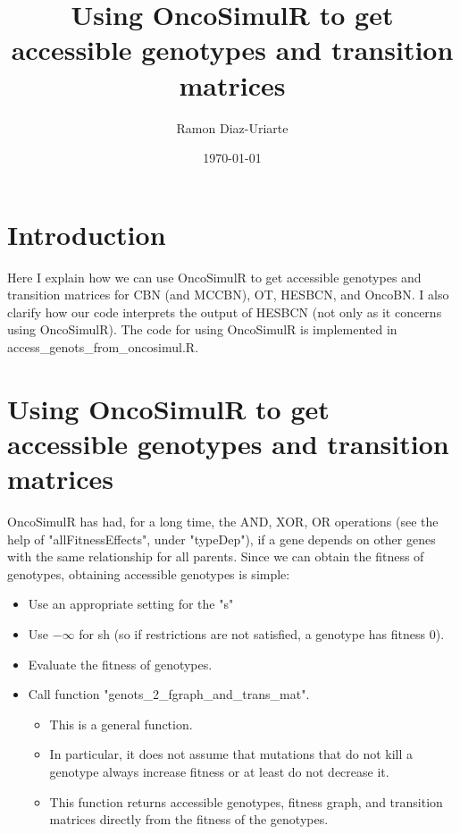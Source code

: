 \documentclass[11pt]{article}
\author{Ramon Diaz-Uriarte}
\date{\today}
\title{Using OncoSimulR to get accessible genotypes and transition matrices}
\begin{document}
\maketitle
\tableofcontents



\section{Introduction}
\label{sec:org58f26ba}
Here I explain how we can use OncoSimulR to get accessible genotypes and transition matrices for CBN (and MCCBN), OT, HESBCN, and OncoBN. I also clarify how our code interprets the output of HESBCN (not only as it concerns using OncoSimulR). The code for using OncoSimulR is implemented in access\_genots\_from\_oncosimul.R. 

\section{Using OncoSimulR to get accessible genotypes and transition matrices}
\label{sec:org653c242}

OncoSimulR has had, for a long time, the AND, XOR, OR operations (see the help of "allFitnessEffects", under "typeDep"), if a gene depends on other genes with the same relationship for all parents. Since we can obtain the fitness of genotypes, obtaining accessible genotypes is simple:


\begin{itemize}
\item Use an appropriate setting for the "s"
\item Use \(-\infty\) for sh (so if restrictions are not satisfied, a genotype has
fitness 0).
\item Evaluate the fitness of genotypes.
\item Call function "genots\_2\_fgraph\_and\_trans\_mat".
\begin{itemize}
\item This is a general function.
\item In particular, it does not assume that mutations that do not kill a
genotype always increase fitness or at least do not decrease it.
\item This function returns accessible genotypes, fitness graph, and transition matrices directly from the fitness of the genotypes.
\end{itemize}
\end{itemize}
\end{document}

